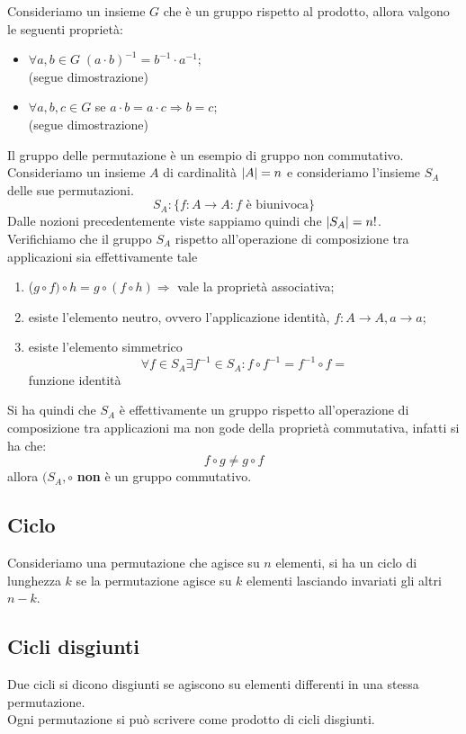 \begin{flushleft}
Consideriamo un insieme $G$ che è un gruppo rispetto al prodotto, allora valgono le seguenti proprietà:
\begin{itemize}
    \item $\forall a,b \in G\;(a\cdot b)^{-1} = b^{-1} \cdot a^{-1}$;\\
    (segue dimostrazione)
    \\ \vspace{300px}
    \item $\forall a,b,c\in G$ se $a\cdot b = a\cdot c \Rightarrow b = c$;\\
    (segue dimostrazione)
    \\ \vspace{300px}
\end{itemize}
Il gruppo delle permutazione è un esempio di gruppo non commutativo.\\
Consideriamo un insieme $A$ di cardinalità $\abs{A} = n$ e consideriamo l'insieme $S_A$ delle sue permutazioni.\\
\[S_A : \{f:A\to A: f\text{ è biunivoca}\}\]
Dalle nozioni precedentemente viste sappiamo quindi che $\abs{S_A} = n!$.\\
Verifichiamo che il gruppo $S_A$ rispetto all'operazione di composizione tra applicazioni sia effettivamente tale
\begin{enumerate}
    \item ($g \circ f)\circ h = g\circ (f\circ h)\Rightarrow$ vale la proprietà associativa;
    \item esiste l'elemento neutro, ovvero l'applicazione identità, $f:A\to A, a\to a$;
    \item esiste l'elemento simmetrico
    \[\forall f \in S_A \exists f^{-1}\in S_A: f\circ f^{-1} = f^{-1}\circ f =\] funzione identità
\end{enumerate}
Si ha quindi che $S_A$ è effettivamente un gruppo rispetto all'operazione di composizione tra applicazioni ma non gode della proprietà commutativa, infatti si ha che:
\[f\circ g \neq g \circ f\]
allora $(S_A, \circ$ \textbf{non} è un gruppo commutativo.

\subsection{Ciclo}
Consideriamo una permutazione che agisce su $n$ elementi, si ha un ciclo di lunghezza $k$ se la permutazione agisce su $k$ elementi lasciando invariati gli altri $n-k$.

\subsection{Cicli disgiunti}
Due cicli si dicono disgiunti se agiscono su elementi differenti in una stessa permutazione.\\
Ogni permutazione si può scrivere come prodotto di cicli disgiunti.


\end{flushleft}
